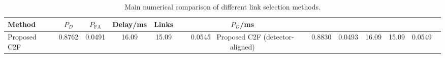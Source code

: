 \begin{table}[t]
    \centering
    \caption{Main numerical comparison of different link selection methods.}
    \label{tab:main_summary}
    \begin{tabular}{l c c c c c}
        \hline
        Method & $P_D$ & $P_{\mathrm{FA}}$ & Delay/ms & Links & $P_D$/ms \\
        \hline
        Proposed C2F & 0.8762 & 0.0491 & 16.09 & 15.09 & 0.0545 \
        Proposed C2F (detector-aligned) & 0.8830 & 0.0493 & 16.09 & 15.09 & 0.0549 \
        \hline
    \end{tabular}
\end{table}
